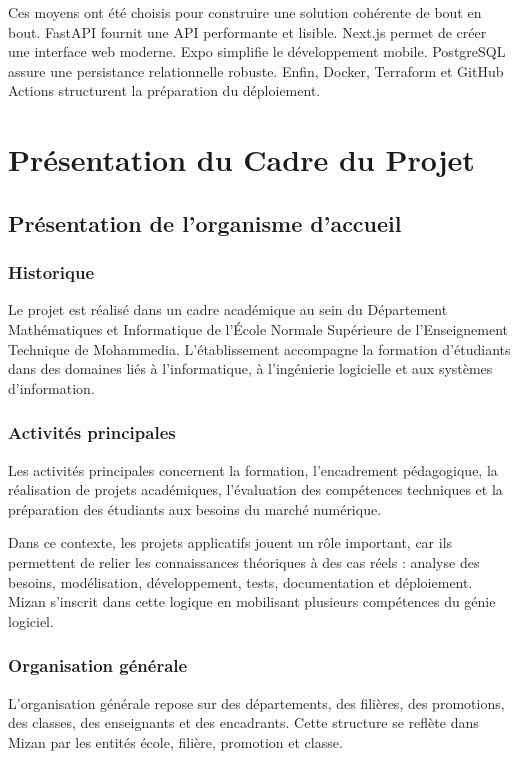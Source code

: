 \documentclass{rapportENSET}
\begin{document}
Ces moyens ont été choisis pour construire une solution cohérente de bout en bout. FastAPI fournit une API performante et lisible. Next.js permet de créer une interface web moderne. Expo simplifie le développement mobile. PostgreSQL assure une persistance relationnelle robuste. Enfin, Docker, Terraform et GitHub Actions structurent la préparation du déploiement.


\section{Présentation du Cadre du Projet}
\subsection{Présentation de l'organisme d'accueil}
\subsubsection*{Historique}
Le projet est réalisé dans un cadre académique au sein du Département Mathématiques et Informatique de l'École Normale Supérieure de l'Enseignement Technique de Mohammedia. L'établissement accompagne la formation d'étudiants dans des domaines liés à l'informatique, à l'ingénierie logicielle et aux systèmes d'information.

\subsubsection*{Activités principales}
Les activités principales concernent la formation, l'encadrement pédagogique, la réalisation de projets académiques, l'évaluation des compétences techniques et la préparation des étudiants aux besoins du marché numérique.

Dans ce contexte, les projets applicatifs jouent un rôle important, car ils permettent de relier les connaissances théoriques à des cas réels : analyse des besoins, modélisation, développement, tests, documentation et déploiement. Mizan s'inscrit dans cette logique en mobilisant plusieurs compétences du génie logiciel.

\subsubsection*{Organisation générale}
L'organisation générale repose sur des départements, des filières, des promotions, des classes, des enseignants et des encadrants. Cette structure se reflète dans Mizan par les entités école, filière, promotion et classe.
\end{document}
